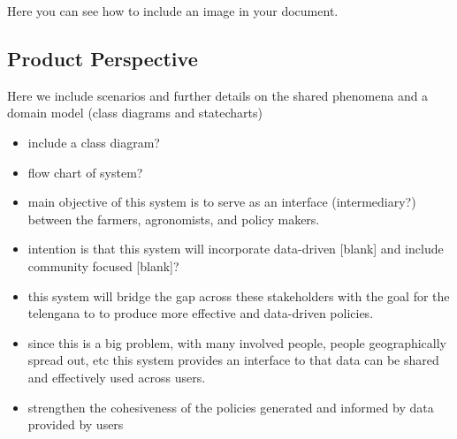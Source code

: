 Here you can see how to include an image in your document.

\subsection{Product Perspective}
\begin{flushleft}

Here we include scenarios and further details on the shared phenomena and a domain model (class diagrams and statecharts)
\end{flushleft}

\begin{itemize}
\item
include a class diagram?
\item
flow chart of system?
\item
main objective of this system is to serve as an interface (intermediary?) between the farmers, agronomists, and policy makers. 
\item
intention is that this system will incorporate data-driven [blank] and include community focused [blank]? 
\item
this system will bridge the gap across these stakeholders with the goal for the telengana to to produce more effective and data-driven policies.
\item
since this is a big problem, with many involved people, people geographically spread out, etc this system provides an interface to that data can be shared and effectively used across users. 
\item
strengthen the cohesiveness of the policies generated and informed by data provided by users
\end{itemize}


